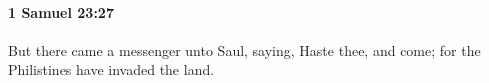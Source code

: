 
		\paragraph{1 Samuel 23:27} %
			\label{1SAMUEL-23-27}

			But there came a messenger unto Saul, saying, Haste thee, and come; for the Philistines have invaded the land.


